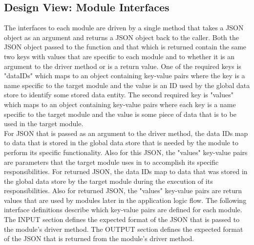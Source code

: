 \documentclass[onecolumn, draftclsnofoot,10pt, compsoc]{IEEEtran}
\begin{document}
    \subsection{Design View: Module Interfaces}
        The interfaces to each module are driven by a single method that takes a JSON object as an argument and returns a JSON object back to the caller.
        Both the JSON object passed to the function and that which is returned contain the same two keys with values that are specific to each module and to whether it is an argument to the driver method or is a return value.
        One of the required keys is "dataIDs" which maps to an object containing key-value pairs where the key is a name specific to the target module and the value is an ID used by the global data store to identify some stored data entity.
        The second required key is "values" which maps to an object containing key-value pairs where each key is a name specific to the target module and the value is some piece of data that is to be used in the target module.
        \\[0.1in]
        For JSON that is passed as an argument to the driver method, the data IDs map to data that is stored in the global data store that is needed by the module to perform its specific functionality. 
        Also for this JSON, the "values" key-value pairs are parameters that the target module uses in to accomplish its specific responsibilities.
        For returned JSON, the data IDs map to data that was stored in the global data store by the target module during the execution of its responsibilities.
        Also for returned JSON, the "values" key-value pairs are return values that are used by modules later in the application logic flow.
        The following interface definitions describe which key-value pairs are defined for each module. 
        \\[0.1in]
        The INPUT section defines the expected format of the JSON that is passed to the module's driver method.
        The OUTPUT section defines the expected format of the JSON that is returned from the module's driver method.
\end{document}
